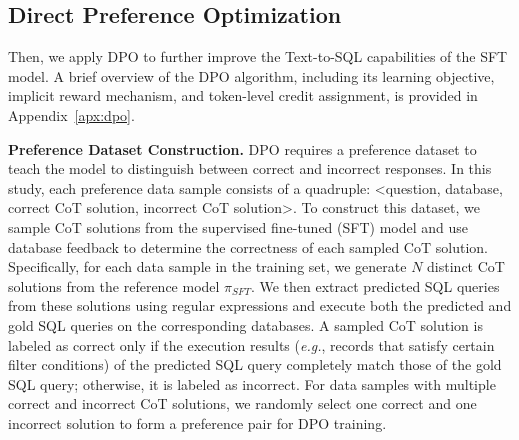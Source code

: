 




\subsection{Direct Preference Optimization}
Then, we apply DPO \citep{rafailov2024dpo} to further improve the Text-to-SQL capabilities of the SFT model. A brief overview of the DPO algorithm, including its learning objective, implicit reward mechanism, and token-level credit assignment, is provided in Appendix~\ref{apx:dpo}.



\textbf{Preference Dataset Construction.}
DPO requires a preference dataset to teach the model to distinguish between correct and incorrect responses. In this study, each preference data sample consists of a quadruple: <question, database, correct CoT solution, incorrect CoT solution>. To construct this dataset, we sample CoT solutions from the supervised fine-tuned (SFT) model and use database feedback to determine the correctness of each sampled CoT solution. Specifically, for each data sample in the training set, we generate $N$ distinct CoT solutions from the reference model $\pi_{SFT}$. We then extract predicted SQL queries from these solutions using regular expressions and execute both the predicted and gold SQL queries on the corresponding databases. A sampled CoT solution is labeled as correct only if the execution results (\emph{e.g.}, records that satisfy certain filter conditions) of the predicted SQL query completely match those of the gold SQL query; otherwise, it is labeled as incorrect. For data samples with multiple correct and incorrect CoT solutions, we randomly select one correct and one incorrect solution to form a preference pair for DPO training.


